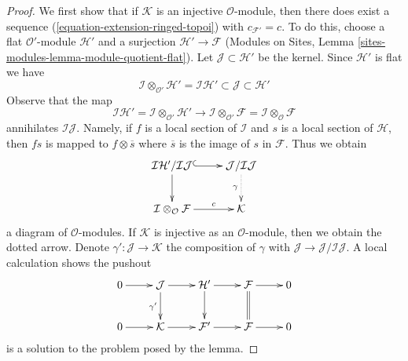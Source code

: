 \documentclass{stacks-project}
\theoremstyle{plain}
\theoremstyle{definition}
\theoremstyle{remark}
\numberwithin{equation}{subsection}
\begin{document}
\begin{proof}
We first show that if $\mathcal{K}$ is an injective $\mathcal{O}$-module,
then there does exist a sequence (\ref{equation-extension-ringed-topoi}) with
$c_{\mathcal{F}'} = c$. To do this, choose a flat
$\mathcal{O}'$-module $\mathcal{H}'$ and a surjection
$\mathcal{H}' \to \mathcal{F}$
(Modules on Sites, Lemma \ref{sites-modules-lemma-module-quotient-flat}).
Let $\mathcal{J} \subset \mathcal{H}'$ be the kernel. Since $\mathcal{H}'$
is flat we have
$$
\mathcal{I} \otimes_{\mathcal{O}'} \mathcal{H}' =
\mathcal{I}\mathcal{H}'
\subset \mathcal{J} \subset \mathcal{H}'
$$
Observe that the map
$$
\mathcal{I}\mathcal{H}' =
\mathcal{I} \otimes_{\mathcal{O}'} \mathcal{H}'
\longrightarrow
\mathcal{I} \otimes_{\mathcal{O}'} \mathcal{F} =
\mathcal{I} \otimes_\mathcal{O} \mathcal{F}
$$
annihilates $\mathcal{I}\mathcal{J}$. Namely, if $f$ is a local section
of $\mathcal{I}$ and $s$ is a local section of $\mathcal{H}$, then
$fs$ is mapped to $f \otimes \overline{s}$ where $\overline{s}$ is
the image of $s$ in $\mathcal{F}$. Thus we obtain
$$
\xymatrix{
\mathcal{I}\mathcal{H}'/\mathcal{I}\mathcal{J}
\ar@{^{(}->}[r] \ar[d] &
\mathcal{J}/\mathcal{I}\mathcal{J} \ar@{..>}[d]_\gamma \\
\mathcal{I} \otimes_\mathcal{O} \mathcal{F} \ar[r]^-c &
\mathcal{K}
}
$$
a diagram of $\mathcal{O}$-modules. If $\mathcal{K}$ is injective
as an $\mathcal{O}$-module, then we obtain the dotted arrow.
Denote $\gamma' : \mathcal{J} \to \mathcal{K}$ the composition
of $\gamma$ with $\mathcal{J} \to \mathcal{J}/\mathcal{I}\mathcal{J}$.
A local calculation shows the pushout
$$
\xymatrix{
0 \ar[r] &
\mathcal{J} \ar[r] \ar[d]_{\gamma'} &
\mathcal{H}' \ar[r] \ar[d] &
\mathcal{F} \ar[r] \ar@{=}[d] &
0 \\
0 \ar[r] &
\mathcal{K} \ar[r] &
\mathcal{F}' \ar[r] &
\mathcal{F} \ar[r] &
0
}
$$
is a solution to the problem posed by the lemma.


\end{proof}
\end{document}
